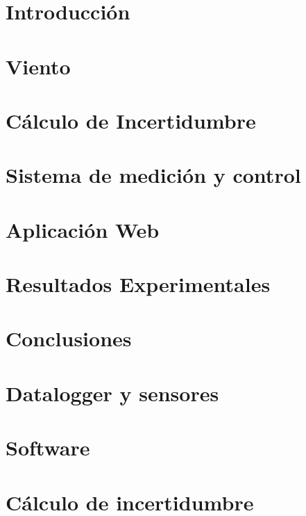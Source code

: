 \documentclass[11pt, a4paper,oneside]{book}
\begin{document}


\clearpage\hbox{}\thispagestyle{empty}\newpage

\clearpage\hbox{}\thispagestyle{empty}\newpage

\clearpage\hbox{}\thispagestyle{empty}\newpage

\clearpage\hbox{}\thispagestyle{empty}\newpage
\tableofcontents
\newpage

\setcounter{page}{1}

\chapter{Introducción}\label{cap:introduccion}

\chapter{Viento}\label{cap:viento}

\chapter{Cálculo de Incertidumbre}\label{cap:incertidumbre}

\chapter{Sistema de medición y control}\label{cap:datalogger}

\chapter{Aplicación Web}\label{cap:aplicacionweb}

\chapter{Resultados Experimentales}\label{cap:med_result}

\chapter{Conclusiones}



\appendix
\chapter{Datalogger y sensores}

\chapter{Software}

\chapter{Cálculo de incertidumbre}

\printbibliography
\end{document}
